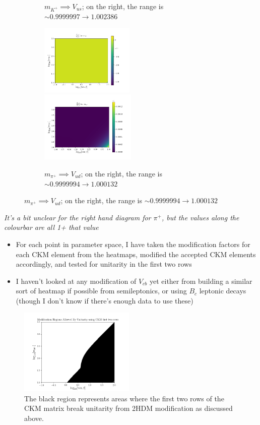 \documentclass[11pt]{article}
\begin{document}
\begin{figure}[H]
\begin{subfigure}[b]{\textwidth}
        \caption{$m_{K^+} \implies V_{us}$; on the right, the range is $\sim0.9999997\to1.002386$}
    \end{subfigure}
    \begin{subfigure}[b]{\textwidth}
        \includegraphics[width=0.49\textwidth]{heatmaps/mpi-rH0.png}
        \includegraphics[width=0.5\textwidth]{heatmaps/mpi-rH1.png}
        \caption{$m_{\pi^+} \implies V_{ud}$; on the right, the range is $\sim0.9999994\to1.000132$}
    \end{subfigure}
\end{figure}
\textit{It's a bit unclear for the right hand diagram for $\pi^+$, but the values along the colourbar are all 1+ that value}

\newpage
\begin{itemize}
    \item For each point in parameter space, I have taken the modification factors for each CKM element from the heatmaps, modified the accepted CKM elements accordingly, and tested for unitarity in the first two rows
    \item I haven't looked at any modification of $V_{cb}$ yet either from building a similar sort of heatmap if possible from semileptonics, or using $B_c$ leptonic decays (though I don't know if there's enough data to use these)
\end{itemize}

\begin{figure}[H]
    \centering
    \includegraphics[width=0.49\textwidth]{heatmaps/ckm_mod_errs.png}
    \caption{The black region represents areas where the first two rows of the CKM matrix break unitarity from 2HDM modification as discussed above.}
\end{figure}
\end{document}
